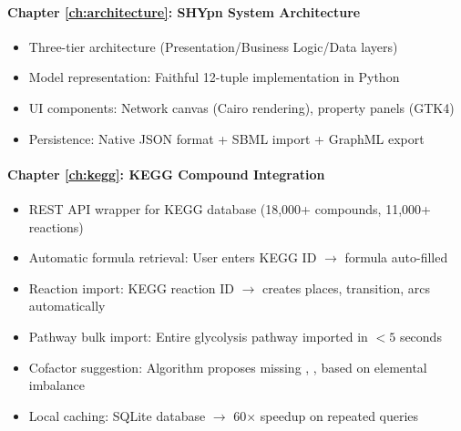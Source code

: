 \paragraph{Chapter \ref{ch:architecture}: SHYpn System Architecture}
\begin{itemize}
    \item Three-tier architecture (Presentation/Business Logic/Data layers)
    \item Model representation: Faithful 12-tuple implementation in Python
    \item UI components: Network canvas (Cairo rendering), property panels (GTK4)
    \item Persistence: Native JSON format + SBML import + GraphML export
\end{itemize}

\paragraph{Chapter \ref{ch:kegg}: KEGG Compound Integration}
\begin{itemize}
    \item REST API wrapper for KEGG database (18,000+ compounds, 11,000+ reactions)
    \item Automatic formula retrieval: User enters KEGG ID $\to$ formula auto-filled
    \item Reaction import: KEGG reaction ID $\to$ creates places, transition, arcs automatically
    \item Pathway bulk import: Entire glycolysis pathway imported in $<5$ seconds
    \item Cofactor suggestion: Algorithm proposes missing , ,  based on elemental imbalance
    \item Local caching: SQLite database $\to$ 60$\times$ speedup on repeated queries
\end{itemize}

